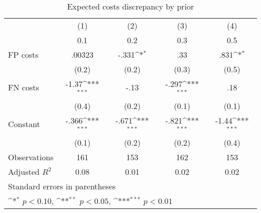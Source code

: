 \begin{table}[htbp]\centering
\def\sym#1{\ifmmode^{#1}\else\(^{#1}\)\fi}
\caption{Expected costs discrepancy by prior}
\begin{tabular}{l*{4}{c}}
\hline\hline
                &\multicolumn{1}{c}{(1)}&\multicolumn{1}{c}{(2)}&\multicolumn{1}{c}{(3)}&\multicolumn{1}{c}{(4)}\\
                &\multicolumn{1}{c}{0.1}&\multicolumn{1}{c}{0.2}&\multicolumn{1}{c}{0.3}&\multicolumn{1}{c}{0.5}\\
\hline
FP costs        &   .00323         &    -.331\sym{*}  &      .33         &     .831\sym{*}  \\
                &    (0.2)         &    (0.2)         &    (0.3)         &    (0.5)         \\
FN costs        &    -1.37\sym{***}&     -.13         &    -.297\sym{***}&      .18         \\
                &    (0.4)         &    (0.2)         &    (0.1)         &    (0.1)         \\
Constant        &    -.366\sym{***}&    -.671\sym{***}&    -.821\sym{***}&    -1.44\sym{***}\\
                &    (0.1)         &    (0.2)         &    (0.2)         &    (0.4)         \\
\hline
Observations    &      161         &      153         &      162         &      153         \\
Adjusted \(R^{2}\)&     0.08         &     0.01         &     0.02         &     0.02         \\
\hline\hline
\multicolumn{5}{l}{\footnotesize Standard errors in parentheses}\\
\multicolumn{5}{l}{\footnotesize \sym{*} \(p<0.10\), \sym{**} \(p<0.05\), \sym{***} \(p<0.01\)}\\
\end{tabular}
\end{table}
